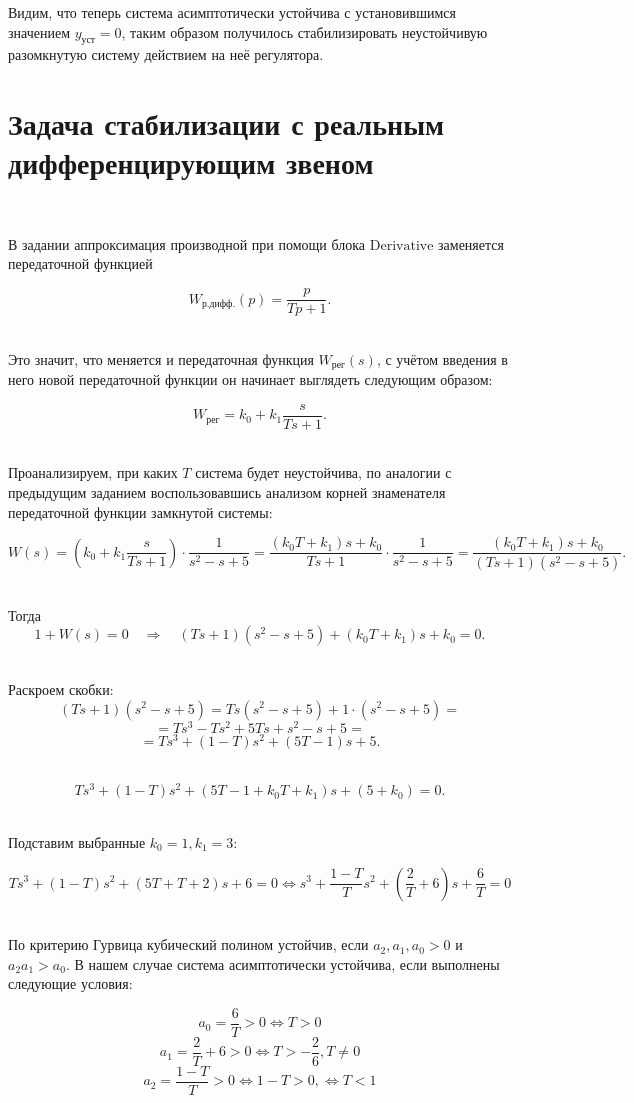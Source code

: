 \documentclass[a4paper]{article}
\begin{document}
Видим, что теперь система асимптотически устойчива с установившимся значением $y_{\text{уст}} = 0$, таким образом получилось стабилизировать неустойчивую разомкнутую систему действием на неё регулятора.

\section{Задача стабилизации с реальным дифференцирующим звеном}\

В задании аппроксимация производной при помощи блока $\text{Derivative}$ заменяется передаточной функцией

$$
W_{\text{р.дифф.}}(p) = \frac{p}{Tp+1}.
$$\

Это значит, что меняется и передаточная функция $W_{\text{рег}}(s)$, с учётом введения в него новой передаточной функции он начинает выглядеть следующим образом:

$$
W_{\text{рег}} = k_0+k_1\frac{s}{Ts+1}.
$$\ 

Проанализируем, при каких $T$ система будет неустойчива, по аналогии с предыдущим заданием воспользовавшись анализом корней знаменателя передаточной функции замкнутой системы:

$$
W(s) = \left(k_0 + k_1 \frac{s}{T s + 1}\right) \cdot \frac{1}{s^2 - s + 5} = \frac{(k_0 T + k_1)s + k_0}{T s + 1}\cdot \frac{1}{s^2 - s + 5} = \frac{(k_0 T + k_1)s + k_0}{(T s + 1)(s^2 - s + 5)}.
$$\

Тогда
$$
1 + W(s) = 0 \quad \Rightarrow \quad (T s + 1)(s^2 - s + 5) + (k_0 T + k_1)s + k_0 = 0.
$$\ 

Раскроем скобки:  
$$
(T s + 1)(s^2 - s + 5) = T s(s^2 - s + 5) + 1\cdot(s^2 - s + 5)=
$$
$$
= T s^3 - T s^2 + 5T s + s^2 - s + 5=
$$
$$
= T s^3 + (1 - T)s^2 + (5T - 1)s + 5.
$$\

$$
T s^3 + (1-T)s^2 + (5T - 1 + k_0 T + k_1)s + (5 + k_0) = 0.
$$\ 

Подставим выбранные $k_0 = 1, k_1 = 3$:

$$
T s^3 + (1-T)s^2 + (5T + T + 2)s + 6 = 0 \Leftrightarrow s^3 + \frac{1-T}{T}s^2 + \left(\frac{2}{T} + 6\right)s + \frac{6}{T} = 0
$$\

По критерию Гурвица кубический полином устойчив, если $a_2, a_1, a_0 > 0$ и $a_2 a_1 > a_0$. В нашем случае система асимптотически устойчива, если выполнены следующие условия:

$$
a_0 = \frac{6}{T} > 0 \Leftrightarrow T > 0
$$
$$
a_1 = \frac{2}{T} + 6 > 0 \Leftrightarrow T > -\frac{2}{6}, T\neq0
$$
$$
a_2 = \frac{1 - T}{T} > 0 \Leftrightarrow 1 - T > 0, \Leftrightarrow T < 1
$$\ 
\end{document}
